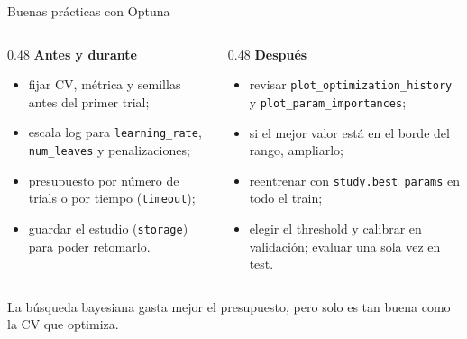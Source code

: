 \documentclass[aspectratio=169,12pt]{beamer}
\newcommand{\colhead}[1]{\textbf{#1}\par\vspace{2pt}}
\begin{document}
\begin{frame}{Buenas prácticas con Optuna}
  \begin{columns}[T]
    \begin{column}{0.48\textwidth}
      \colhead{Antes y durante}
      \footnotesize
      \begin{itemize}
        \item fijar CV, métrica y semillas antes del primer trial;
        \item escala log para \texttt{learning\_rate}, \texttt{num\_leaves} y penalizaciones;
        \item presupuesto por número de trials o por tiempo (\texttt{timeout});
        \item guardar el estudio (\texttt{storage}) para poder retomarlo.
      \end{itemize}
    \end{column}
    \begin{column}{0.48\textwidth}
      \colhead{Después}
      \footnotesize
      \begin{itemize}
        \item revisar \texttt{plot\_optimization\_history} y \texttt{plot\_param\_importances};
        \item si el mejor valor está en el borde del rango, ampliarlo;
        \item reentrenar con \texttt{study.best\_params} en todo el train;
        \item elegir el threshold y calibrar en validación; evaluar una sola vez en test.
      \end{itemize}
    \end{column}
  \end{columns}
  \vspace{6pt}
  \begin{keybox}
    \small La búsqueda bayesiana gasta mejor el presupuesto, pero solo es tan buena como la CV que optimiza.
  \end{keybox}
\end{frame}
\end{document}
